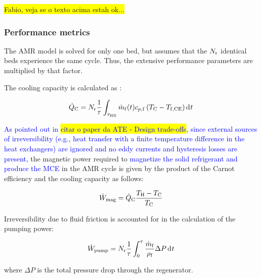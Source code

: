\documentclass[referee]{svjour3}
\newcommand{\mrate}{\rate{m}}
\begin{document}
\colorbox{yellow}{Fabio, veja se o texto acima estah ok...}


\subsubsection{Performance metrics}
\label{sec:performance-metrics}

The AMR model is solved for only one bed, but  assumes that the $N_{\mathrm{r}}$ identical beds experience the same cycle. Thus, the extensive performance parameters are multiplied by that factor.


The cooling capacity is calculated as \cite{bib:trevizoli16_perfor_model}:

\begin{equation}
\label{eq:99}
\qc = N\ped{r}\frac{1}{\tau} \int_{\tau\ped{HB}} \mrate\ped{f}(t) c_{p,\mathrm{f}} \left( T\ped{C} -T\ped{f,CE} \right) \diffd{t}
\end{equation}


\nomenclature[am]{$\mrate\ped{f}$}{mass flow rate [\si{\kg\per\second}]}


\textcolor{blue}{As pointed out in \colorbox{yellow}{citar o paper da ATE - Design trade-offs}, since external sources of irreversibility (e.g., heat transfer with a finite temperature difference in the heat exchangers) are ignored and no eddy currents and hysteresis losses are present,} the magnetic power required to \textcolor{blue}{magnetize the solid refrigerant and produce the MCE} in the AMR cycle is given by the product of the Carnot efficiency and the cooling capacity as follows:

\begin{equation}
\label{eq:100}
\dot{W}_{\mathrm{mag}} = \dot{Q}_{\mathrm{C}} \frac{T_{\mathrm{H}} - T_{\mathrm{C}}}{T_{\mathrm{C}}}
\end{equation}

Irreversibility due to fluid friction is accounted for in the calculation of the pumping power:

\begin{equation}
\label{eq:103}
\wpump = N\ped{r}\frac{1}{\tau}\int_0^{\tau}\frac{\rate{m}\ped{f}}{\rho\ped{f}} \Delta P \diffd{t}
\end{equation}

\noindent where $\Delta P$ is the total pressure drop through the regenerator.
\end{document}
